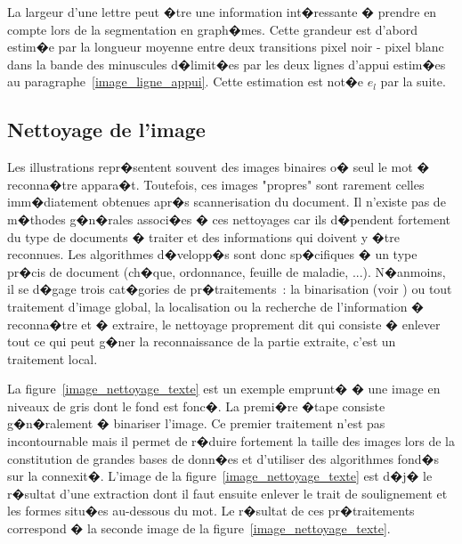 La largeur d'une lettre peut �tre une information int�ressante � prendre en compte lors de la segmentation en graph�mes. Cette grandeur est d'abord estim�e par la longueur moyenne entre deux transitions pixel noir - pixel blanc dans la bande des minuscules d�limit�es par les deux lignes d'appui estim�es au paragraphe~\ref{image_ligne_appui}. Cette estimation est not�e $e_l$ par la suite.







\subsection{Nettoyage de l'image}


Les illustrations repr�sentent souvent des images binaires o� seul le mot � reconna�tre appara�t. Toutefois, ces images "propres" sont rarement celles imm�diatement obtenues apr�s scannerisation du document. Il n'existe pas de m�thodes g�n�rales associ�es � ces nettoyages car ils d�pendent fortement du type de documents � traiter et des informations qui doivent y �tre reconnues. Les algorithmes d�velopp�s sont donc sp�cifiques � un type pr�cis de document (ch�que, ordonnance, feuille de maladie, ...). N�anmoins, il se d�gage trois cat�gories de pr�traitements~: la binarisation (voir ) ou tout traitement d'image global, la localisation ou la recherche de l'information � reconna�tre et � extraire, le nettoyage proprement dit qui consiste � enlever tout ce qui peut g�ner la reconnaissance de la partie extraite, c'est un traitement local.


La figure~\ref{image_nettoyage_texte} est un exemple emprunt� � une image en niveaux de gris dont le fond est fonc�. La premi�re �tape consiste g�n�ralement � binariser l'image. Ce premier traitement n'est pas incontournable mais il permet de r�duire fortement la taille des images lors de la constitution de grandes bases de donn�es et d'utiliser des algorithmes fond�s sur la connexit�. L'image de la figure~\ref{image_nettoyage_texte} est d�j� le r�sultat d'une extraction dont il faut ensuite enlever le trait de soulignement et les formes situ�es au-dessous du mot. Le r�sultat de ces pr�traitements correspond � la seconde image de la figure~\ref{image_nettoyage_texte}.



